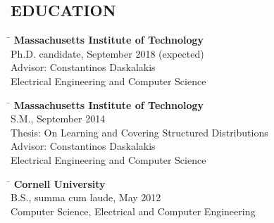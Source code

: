 \documentclass{res}
\begin{document}
 


\address{\bf  ADDRESS\\32 Vassar Street\\Room 32-G628\\Cambridge, MA 02139}
\address{\bf CONTACT \\Website: \url{www.gautamkamath.com} \\Cell: (657) 206-7724\\Email: g@csail.mit.edu\\ Skype ID: hoonose\_me}
                                  
\begin{resume}

\section{EDUCATION}
    \vspace{-0.1in}
    \begin{tabbing}
    \hspace{0.3in}\= \kill %
    {\bf Massachusetts Institute of Technology}  \\        
    \> Ph.D. candidate, September 2018 (expected) \\
    \> Advisor: Constantinos Daskalakis \\
    \> Electrical Engineering and Computer Science \\
    \end{tabbing}
    \vspace{-0.4in}
    \begin{tabbing}
    \hspace{0.3in}\= \kill %
    {\bf Massachusetts Institute of Technology}  \\        
    \> S.M., September 2014 \\
    \> Thesis: On Learning and Covering Structured Distributions \\
    \> Advisor: Constantinos Daskalakis \\
    \> Electrical Engineering and Computer Science \\
    \end{tabbing}
    \vspace{-0.4in}
    \begin{tabbing}
    \hspace{0.3in}\= \kill %
    {\bf Cornell University}  \\        
    \> B.S., summa cum laude, May 2012 \\
    \> Computer Science, Electrical and Computer Engineering
    \end{tabbing}


\end{resume}
\end{document}
